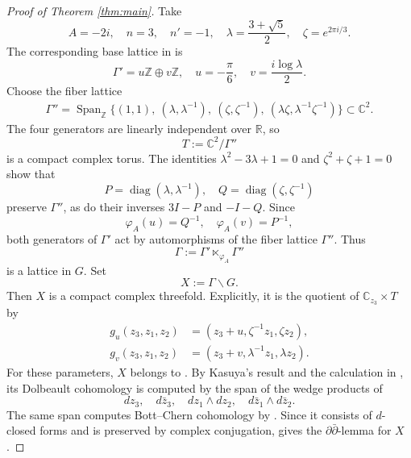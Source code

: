 \documentclass[11pt]{amsart}
\newcommand{\C}{\mathbb C}
\newcommand{\Z}{\mathbb Z}
\newcommand{\ddbar}{\partial\bar\partial}
\numberwithin{equation}{section}
\theoremstyle{definition}
\theoremstyle{plain}
\theoremstyle{plain}
\theoremstyle{definition}
\theoremstyle{stepstyle}
\begin{document}
\begin{proof}[{Proof of Theorem \ref{thm:main}}]
		Take
		\begin{equation*}\label{eq:parameters}
			A=-2i,\quad n=3,\quad n'=-1,\quad
			\lambda=\frac{3+\sqrt5}{2},\quad \zeta=e^{2\pi i/3}.
		\end{equation*}
		The corresponding base lattice in \cite[Table 1, p. 8]{Rubini} is
		\begin{equation}\label{eq:base-lattice}
			\Gamma'=u\Z\oplus v\Z,\quad
			u=-\frac\pi6,\quad v=\frac{i\log\lambda}{2}.
		\end{equation}
		Choose the fiber lattice
		\begin{equation*}\label{eq:fiber-lattice}
			\begin{aligned}
				\Gamma''=\operatorname{Span}_{\Z}\bigl\{(1,1),\ (\lambda,\lambda^{-1}),\ (\zeta,\zeta^{-1}),\ (\lambda\zeta,\lambda^{-1}\zeta^{-1})\bigr\}
				\subset\C^2.
			\end{aligned}
		\end{equation*}
		The four generators are linearly independent over $\mathbb R$, so
		$$
		T:=\C^2/\Gamma''
		$$
		is a compact complex torus. The identities
		$\lambda^2-3\lambda+1=0$ and $\zeta^2+\zeta+1=0$ show that
		$$
		P=\operatorname{diag}(\lambda,\lambda^{-1}),\quad
		Q=\operatorname{diag}(\zeta,\zeta^{-1})
		$$
		preserve $\Gamma''$, as do their inverses $3I-P$ and $-I-Q$.
		Since
		$$
		\varphi_A(u)=Q^{-1},\quad \varphi_A(v)=P^{-1},
		$$
		both generators of $\Gamma'$ act by automorphisms of the fiber lattice
		$\Gamma''$. Thus
		$$
		\Gamma:=\Gamma'\ltimes_{\varphi_A}\Gamma''
		$$
		is a lattice in $G$. Set
		$$
		X:=\Gamma\backslash G.
		$$
		Then $X$ is a compact complex threefold. Explicitly, it is the quotient
		of $\C_{z_3}\times T$ by
		\begin{equation}\label{eq:deck}
			\begin{aligned}
				g_u(z_3,z_1,z_2)&=(z_3+u,\zeta^{-1}z_1,\zeta z_2),\\
				g_v(z_3,z_1,z_2)&=(z_3+v,\lambda^{-1}z_1,\lambda z_2).
			\end{aligned}
		\end{equation}
		For these parameters, $X$ belongs to 
		\cite[case (i) of Theorem 2.5, p. 9]{Rubini}. By Kasuya's result
		\cite[Corollary 4.2]{Kasuya} and the calculation in
		\cite[Table 7, p. 19]{Rubini}, its Dolbeault cohomology is computed
		by the span of the wedge products of
		$$
		dz_3,\quad d\bar z_3,\quad dz_1\wedge dz_2,\quad
		d\bar z_1\wedge d\bar z_2.
		$$
		The same span computes Bott--Chern cohomology by
		\cite[Theorem 2.16]{AK}.
		Since it consists of $d$-closed forms and is preserved by complex
		conjugation, \cite[Lemma 4.2.13]{Otal} gives the $\ddbar$-lemma for $X$.
		

\end{proof}
\end{document}
